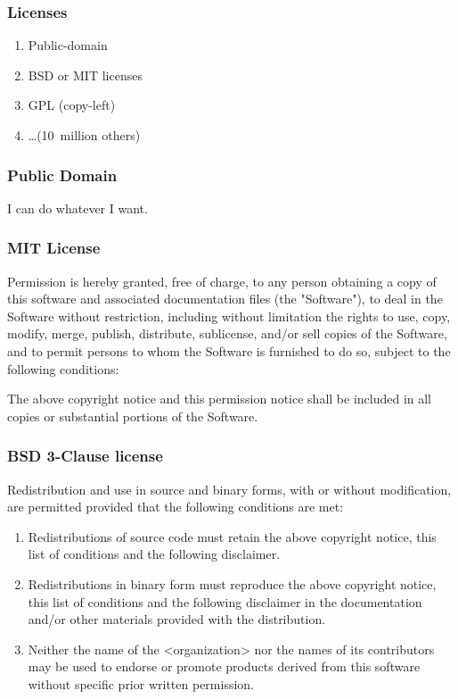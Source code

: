 \begin{frame}[fragile]
\frametitle{Licenses}
\begin{enumerate}
\item Public-domain
\item BSD or MIT licenses
\item GPL (copy-left)
\item \ldots (10~million others)
\end{enumerate}
\end{frame}

\begin{frame}[fragile]
\frametitle{Public Domain}

I can do whatever I want.

\end{frame}

\begin{frame}[fragile]
\frametitle{MIT License}

Permission is hereby granted, free of charge, to any person
obtaining a copy of this software and associated documentation
files (the "Software"), to deal in the Software without
restriction, \alert{including without limitation the rights to use,
copy, modify, merge, publish, distribute, sublicense, and/or sell
copies of the Software}, and to permit persons to whom the
Software is furnished to do so, subject to the following
conditions:

The above copyright notice and this permission notice shall be
included in all copies or substantial portions of the Software.
\end{frame}

\begin{frame}[fragile]
\frametitle{BSD 3-Clause license}

Redistribution and use in source and binary forms, with or without
modification, are permitted provided that the following conditions are met:
\begin{enumerate}
\item Redistributions of source code must retain the above copyright notice, this list of conditions and the following disclaimer.
\item Redistributions in binary form must reproduce the above copyright notice, this list of conditions and the following disclaimer in the documentation and/or other materials provided with the distribution.
\item Neither the name of the <organization> nor the names of its contributors may be used to endorse or promote products derived from this software without specific prior written permission.
\end{enumerate}

\end{frame}

